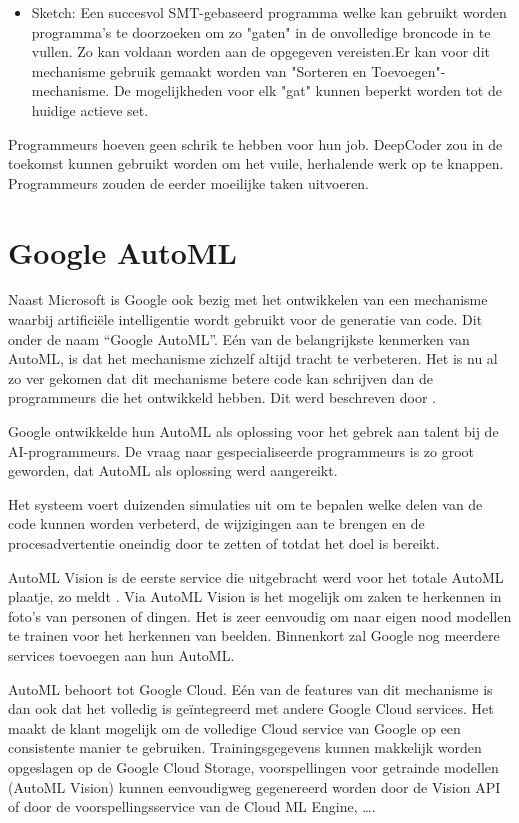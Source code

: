 \begin{description}
\begin{itemize}
		\item Sketch: Een succesvol SMT-gebaseerd programma welke kan gebruikt worden programma's te doorzoeken om zo "gaten" in de onvolledige broncode in te vullen. Zo kan voldaan worden aan de opgegeven vereisten.Er kan voor dit mechanisme gebruik gemaakt worden van "Sorteren en Toevoegen"-mechanisme. De mogelijkheden voor elk "gat" kunnen beperkt worden tot de huidige actieve set.
	\end{itemize}
\end{description}

Programmeurs hoeven geen schrik te hebben voor hun job. DeepCoder zou in de toekomst kunnen gebruikt worden om het vuile, herhalende werk op te knappen. Programmeurs zouden de eerder moeilijke taken uitvoeren.

\section{Google AutoML}

Naast Microsoft is Google ook bezig met het ontwikkelen van een mechanisme waarbij artificiële intelligentie wordt gebruikt voor de generatie van code. Dit onder de naam “Google AutoML”. Eén van de belangrijkste kenmerken van AutoML, is dat het mechanisme zichzelf altijd tracht te verbeteren. Het is nu al zo ver gekomen dat dit mechanisme betere code kan schrijven dan de programmeurs die het ontwikkeld hebben. Dit werd beschreven door \textcite{greene}.

Google ontwikkelde hun AutoML als oplossing voor het gebrek aan talent bij de AI-programmeurs. De vraag naar gespecialiseerde programmeurs is zo groot geworden, dat AutoML als oplossing werd aangereikt. 

Het systeem voert duizenden simulaties uit om te bepalen welke delen van de code kunnen worden verbeterd, de wijzigingen aan te brengen en de procesadvertentie oneindig door te zetten of totdat het doel is bereikt. 

AutoML Vision is de eerste service die uitgebracht werd voor het totale AutoML plaatje, zo meldt \textcite{automl}. Via AutoML Vision is het mogelijk om zaken te herkennen in foto’s van personen of dingen. Het is zeer eenvoudig om naar eigen nood modellen te trainen voor het herkennen van beelden. Binnenkort zal Google nog meerdere services toevoegen aan hun AutoML.

AutoML behoort tot Google Cloud. Eén van de features van dit mechanisme is dan ook dat het volledig is geïntegreerd met andere Google Cloud services. Het maakt de klant mogelijk om de volledige Cloud service van Google op een consistente manier te gebruiken. Trainingsgegevens kunnen makkelijk worden opgeslagen op de Google Cloud Storage, voorspellingen voor getrainde modellen (AutoML Vision) kunnen eenvoudigweg gegenereerd worden door de Vision API of door de voorspellingsservice van de Cloud ML Engine, \dots.

